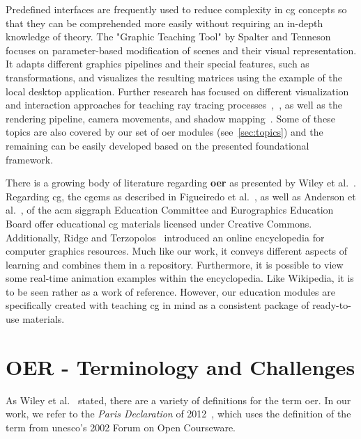 Predefined interfaces are frequently used to reduce complexity in \acrshort{cg} concepts so that they can be comprehended more easily without requiring an in-depth knowledge of theory. The "Graphic Teaching Tool" by Spalter and Tenneson~\cite{Spalter:2006:cg-tool} focuses on parameter-based modification of scenes and their visual representation. It adapts different graphics pipelines and their special features, such as transformations, and visualizes the resulting matrices using the example of the local desktop application. Further research has focused on different visualization and interaction approaches for teaching ray tracing processes~\cite{Suselo:2018:cg-tool},~\cite{ Verschoore-de-la-Houssaije:2022:cg-tool}, as well as the rendering pipeline, camera movements, and shadow mapping~\cite{Eisemann:2023:cg-tool}. Some of these topics are also covered by our set of \acrshort{oer} modules (see~\autoref{sec:topics}) and the remaining can be easily developed based on the presented foundational framework.

There is a growing body of literature regarding \textbf{\acrfull{oer}} as presented by Wiley et al.~\cite{wiley:2014:oer}. Regarding \acrshort{cg}, the \acrfull{cgems} as described in Figueiredo et al.~\cite{figueiredo:2003:cgems}, \cite{figueiredo:2004:cgems2} as well as Anderson et al.~\cite{anderson:2017:NewCGEMS}, of the \acrshort{acm} \acrshort{siggraph} Education Committee and Eurographics Education Board offer educational \acrshort{cg} materials licensed under Creative Commons. Additionally, Ridge and Terzopolos~\cite{ridge:2019:ecosystem} introduced an online encyclopedia for computer graphics resources. Much like our work, it conveys different aspects of learning and combines them in a repository. Furthermore, it is possible to view some real-time animation examples within the encyclopedia. Like Wikipedia, it is to be seen rather as a work of reference. However, our education modules are specifically created with teaching \acrshort{cg} in mind as a consistent package of ready-to-use materials. %


\section{OER - Terminology and Challenges \label{sec:challenges}} %
As Wiley et al.~\cite{wiley:2014:oer} stated, there are a variety of definitions for the term \acrshort{oer}. In our work, we refer to the \emph{Paris Declaration} of 2012~\cite{declaration:2012:paris}, which uses the definition of the term from \acrshort{unesco}’s 2002 Forum on Open Courseware.

